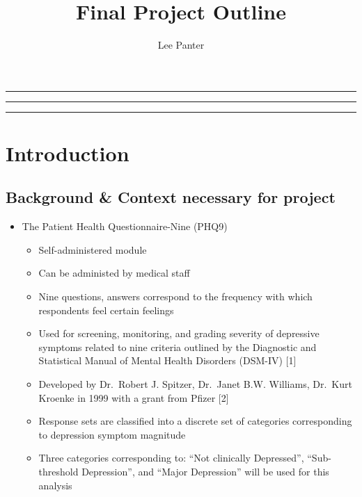 \documentclass[12pt,]{article}
\title{Final Project Outline}
\author{Lee Panter}
\date{}
\providecommand{\tightlist}{%
  \setlength{\itemsep}{0pt}\setlength{\parskip}{0pt}}
\begin{document}
\maketitle

\begin{center}\rule{0.5\linewidth}{\linethickness}\end{center}

\setcounter{secnumdepth}{4}
\setcounter{tocdepth}{4}
\tableofcontents

\begin{center}\rule{0.5\linewidth}{\linethickness}\end{center}

\newpage

\begin{center}\rule{0.5\linewidth}{\linethickness}\end{center}

\hypertarget{introduction}{%
\section{Introduction}\label{introduction}}

\hypertarget{background-context-necessary-for-project}{%
\subsection{Background \& Context necessary for
project}\label{background-context-necessary-for-project}}

\begin{itemize}
\tightlist
\item
  The Patient Health Questionnaire-Nine (PHQ9)

  \begin{itemize}
  \tightlist
  \item
    Self-administered module
  \item
    Can be administed by medical staff
  \item
    Nine questions, answers correspond to the frequency with which
    respondents feel certain feelings
  \item
    Used for screening, monitoring, and grading severity of depressive
    symptoms related to nine criteria outlined by the Diagnostic and
    Statistical Manual of Mental Health Disorders (DSM-IV) {[}1{]}
  \item
    Developed by Dr.~Robert J. Spitzer, Dr.~Janet B.W. Williams,
    Dr.~Kurt Kroenke in 1999 with a grant from Pfizer {[}2{]}
  \item
    Response sets are classified into a discrete set of categories
    corresponding to depression symptom magnitude
  \item
    Three categories corresponding to: ``Not clinically Depressed'',
    ``Sub-threshold Depression'', and ``Major Depression'' will be used
    for this analysis
  \end{itemize}
\end{itemize}
\end{document}
